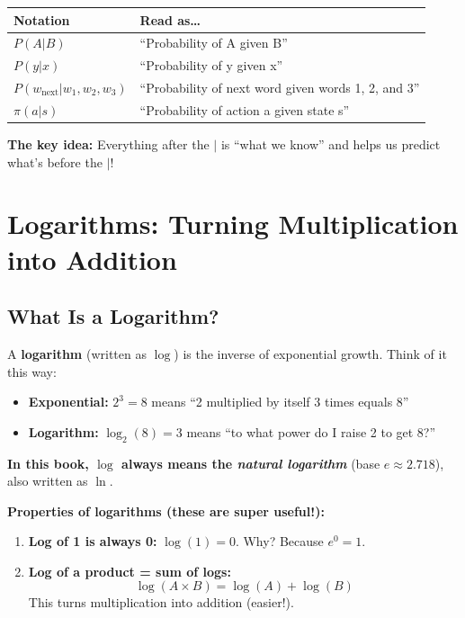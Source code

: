\begin{chapterenv}
\begin{infobox}
\begin{center}
\begin{tabular}{ll}
\toprule
\textbf{Notation} & \textbf{Read as\ldots} \\
\midrule
$P(A | B)$ & ``Probability of A given B'' \\
$P(y | x)$ & ``Probability of y given x'' \\
$P(w_{\text{next}} | w_1, w_2, w_3)$ & ``Probability of next word given words 1, 2, and 3'' \\
$\pi(a | s)$ & ``Probability of action a given state s'' \\
\end{tabular}
\end{center}

\textbf{The key idea:} Everything after the $|$ is ``what we know'' and helps us predict what's before the $|$!
\end{infobox}

\section{Logarithms: Turning Multiplication into Addition}

\subsection{What Is a Logarithm?}

A \textbf{logarithm} (written as $\log$) is the inverse of exponential growth. Think of it this way:

\begin{itemize}[nosep]
    \item \textbf{Exponential:} $2^3 = 8$ means ``2 multiplied by itself 3 times equals 8''
    \item \textbf{Logarithm:} $\log_2(8) = 3$ means ``to what power do I raise 2 to get 8?''
\end{itemize}

\textbf{In this book, $\log$ always means the \textit{natural logarithm}} (base $e \approx 2.718$), also written as $\ln$.

\begin{infobox}
\textbf{Properties of logarithms (these are super useful!):}

\begin{enumerate}[nosep]
    \item \textbf{Log of 1 is always 0:} $\log(1) = 0$. Why? Because $e^0 = 1$.

    \item \textbf{Log of a product = sum of logs:}
    \[\log(A \times B) = \log(A) + \log(B)\]
    This turns multiplication into addition (easier!).


\end{enumerate}
\end{infobox}
\end{chapterenv}
